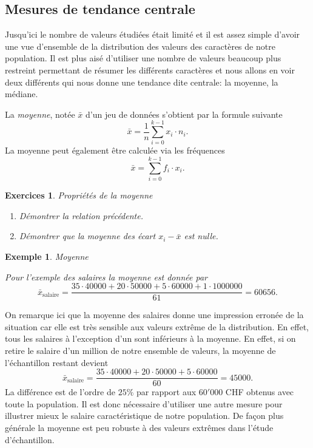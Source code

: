 \documentclass[a4paper,12pt]{book}
\newtheorem*{exemple}{Exemple}
\newtheorem*{exercices}{Exercices}
\begin{document}
\subsection{Mesures de tendance centrale}

Jusqu'ici le nombre de valeurs étudiées était limité et il est assez simple d'avoir 
une vue d'ensemble de la distribution des valeurs des caractères de notre population.
Il est plus aisé d'utiliser une nombre de valeurs beaucoup plus restreint permettant
de résumer les différents caractères et nous allons en voir deux différents qui nous donne une tendance dite centrale:
la moyenne, la médiane.

La \textit{moyenne}, notée $\bar{x}$ d'un jeu de données s'obtient par la formule suivante
\begin{equation}
 \bar{x}=\frac{1}{n}\sum_{i=0}^{k-1}x_i\cdot n_i.
\end{equation}
La moyenne peut également être calculée via les fréquences
\begin{equation}
 \bar{x}=\sum_{i=0}^{k-1}f_i\cdot x_i.
\end{equation}
\begin{exercices}{Propriétés de la moyenne}
\begin{enumerate}
 \item Démontrer la relation précédente.
 \item Démontrer que la moyenne des écart $x_i-\bar{x}$ est nulle.
\end{enumerate}
\end{exercices}

\begin{exemple}{Moyenne}

Pour l'exemple des salaires la moyenne est donnée par
\begin{equation}
 \bar{x}_{\textrm{salaire}}=\frac{35\cdot40000+20\cdot50000+5\cdot60000+1\cdot1000000}{61}=60656.
\end{equation}
\end{exemple}
On remarque ici que la moyenne des salaires donne une impression erronée de la situation car elle est très sensible aux valeurs extrême de la distribution.
En effet, tous les salaires à l'exception d'un sont inférieurs à la moyenne. En effet, si on retire le salaire d'un million de notre ensemble de valeurs, 
la moyenne de l'échantillon restant devient
\begin{equation}
 \bar{x}_{\textrm{salaire}}=\frac{35\cdot40000+20\cdot50000+5\cdot60000}{60}=45000.
\end{equation}
La différence est de l'ordre de $25\%$ par rapport aux $60'000$ CHF obtenus avec toute la population.
Il est donc nécessaire d'utiliser une autre mesure pour illustrer mieux le salaire caractéristique de notre population.
De façon plus générale la moyenne est peu robuste à des valeurs extrêmes dans l'étude d'échantillon.
\end{document}

